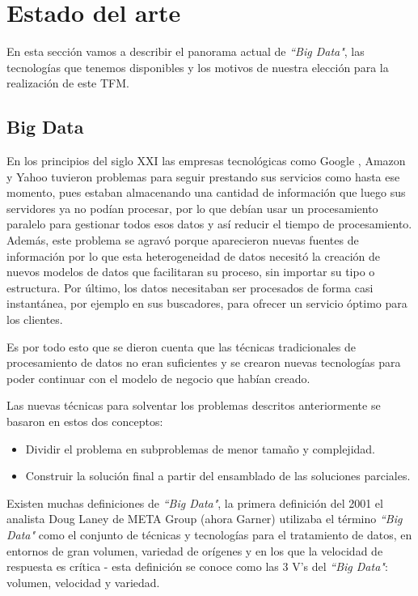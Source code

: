 \chapter{Estado del arte}
\label{chapter:estadodelarte}

En esta sección vamos a describir el panorama actual de \textit{``Big Data"}, las tecnologías que tenemos disponibles y los motivos de nuestra elección para la realización de este TFM.

\section{Big Data}
En los principios del siglo XXI las empresas tecnológicas como Google , Amazon y Yahoo tuvieron problemas para seguir prestando sus servicios como hasta ese momento, pues estaban almacenando una cantidad de información que luego sus servidores ya no podían procesar, por lo que debían usar un procesamiento paralelo para gestionar todos esos datos y así reducir el tiempo de procesamiento. Además, este problema se agravó porque aparecieron nuevas fuentes de información por lo que esta heterogeneidad de datos necesitó la creación de nuevos modelos de datos que facilitaran su proceso, sin importar su tipo o estructura. Por último, los datos necesitaban ser procesados de forma casi instantánea, por ejemplo en sus buscadores, para ofrecer un servicio óptimo para los clientes. 

Es por todo esto que se dieron cuenta que las técnicas tradicionales de procesamiento de datos no eran suficientes y se crearon nuevas tecnologías para poder continuar con el modelo de negocio que habían creado. 

Las nuevas técnicas para solventar los problemas descritos anteriormente se basaron en estos dos conceptos:
\begin{itemize}
    \item Dividir el problema en subproblemas de menor tamaño y complejidad. 
    \item Construir la solución final a partir del ensamblado de las soluciones parciales. 
\end{itemize}

Existen muchas definiciones de \textit{``Big Data"}, la primera definición del 2001 el analista Doug Laney de META Group (ahora Garner) utilizaba el término \textit{``Big Data"}\cite{laney} como el conjunto de técnicas y tecnologías para el tratamiento de datos, en entornos de gran volumen, variedad de orígenes y en los que la velocidad de respuesta es crítica - esta definición se conoce como las 3 V’s del \textit{``Big Data"}: volumen, velocidad y variedad.  

